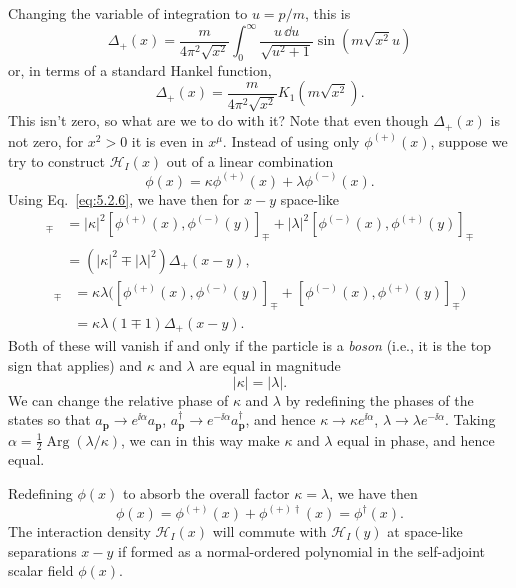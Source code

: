 Changing the variable of integration to $u=p/m$, this is
\begin{equation}
  \Delta_+(x)=\frac{m}{4\pi^2\sqrt{x^2}}
  \int_0^\infty\frac{u\,\dd u}{\sqrt{u^2+1}}
  \sin(m\sqrt{x^2}u)
  \tag{5.2.8}\label{eq:5.2.8}
\end{equation}
or, in terms of a standard Hankel function,
\begin{equation}
  \Delta_+(x)=\frac{m}{4\pi^2\sqrt{x^2}}K_1(m\sqrt{x^2}).
  \tag{5.2.9}\label{eq:5.2.9}
\end{equation}
This isn't zero, so what are we to do with it? Note that even though
$\Delta_+(x)$ is not zero, for $x^2>0$ it is even in $x^\mu$. Instead of using
only $\phi^{(+)}(x)$, suppose we try to construct $\mathcal{H}_I(x)$ out of a
linear combination
\[
  \phi(x)=\kappa\phi^{(+)}(x)+\lambda\phi^{(-)}(x).
\]
Using Eq.~\eqref{eq:5.2.6}, we have then for $x-y$ space-like
\begin{align*}
  [\phi(x),\phi^\dagger(y)]_\mp
  & =|\kappa|^2[\phi^{(+)}(x),\phi^{(-)}(y)]_\mp
  +|\lambda|^2[\phi^{(-)}(x),\phi^{(+)}(y)]_\mp
  \\
  & =(|\kappa|^2\mp|\lambda|^2)\Delta_+(x-y),
\end{align*}
\begin{align*}
  [\phi(x),\phi(y)]_\mp
  & =\kappa\lambda\bigl([\phi^{(+)}(x),\phi^{(-)}(y)]_\mp
  +[\phi^{(-)}(x),\phi^{(+)}(y)]_\mp\bigr)
  \\
  & =\kappa\lambda(1\mp1)\Delta_+(x-y).
\end{align*}
Both of these will vanish if and only if the particle is a \textit{boson}
(i.e., it is the top sign that applies) and $\kappa$ and $\lambda$ are equal
in magnitude
\[
  |\kappa|=|\lambda|.
\]
We can change the relative phase of $\kappa$ and $\lambda$ by redefining the
phases of the states so that $a_{\mathbf{p}}\to e^{\ii\alpha}a_{\mathbf{p}}$,
$a^\dagger_{\mathbf{p}}\to e^{-\ii\alpha}a^\dagger_{\mathbf{p}}$, and hence
$\kappa\to\kappa e^{\ii\alpha}$, $\lambda\to\lambda e^{-\ii\alpha}$. Taking
$\alpha=\tfrac12\operatorname{Arg}(\lambda/\kappa)$, we can in this way make
$\kappa$ and $\lambda$ equal in phase, and hence equal.

Redefining $\phi(x)$ to absorb the overall factor $\kappa=\lambda$, we have then
\begin{equation}
  \phi(x)=\phi^{(+)}(x)+\phi^{(+)\dagger}(x)=\phi^\dagger(x).
  \tag{5.2.10}\label{eq:5.2.10}
\end{equation}
The interaction density $\mathcal{H}_I(x)$ will commute with
$\mathcal{H}_I(y)$ at space-like separations $x-y$ if formed as a
normal-ordered polynomial in the self-adjoint scalar field $\phi(x)$.

